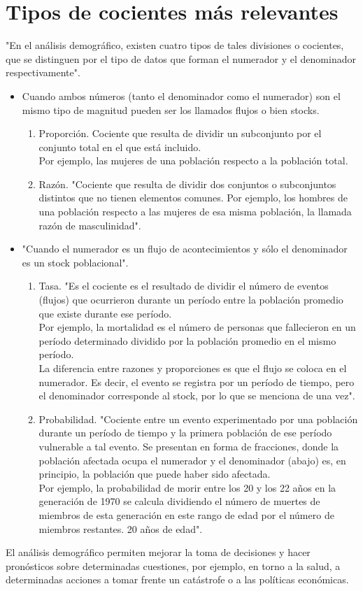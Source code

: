 \section{Tipos de cocientes más relevantes}
"En el análisis demográfico, existen cuatro tipos de tales divisiones o cocientes, que se distinguen por el tipo de datos que forman el numerador y el denominador respectivamente".
\begin{itemize}
    \item Cuando ambos números (tanto el denominador como el numerador) son el mismo tipo de magnitud pueden ser los llamados flujos o bien stocks.
    \begin{enumerate}
        \item Proporción. Cociente que resulta de dividir un subconjunto por el conjunto total en el que está incluido.\\
        Por ejemplo, las mujeres de una población respecto a la población total.
        \item Razón. "Cociente que resulta de dividir dos conjuntos o subconjuntos distintos que no tienen elementos comunes. Por ejemplo, los hombres de una población respecto a las mujeres de esa misma población, la llamada razón de masculinidad".
    \end{enumerate}
    \item "Cuando el numerador es un flujo de acontecimientos y sólo el denominador es un stock poblacional".
    \begin{enumerate}
        \item Tasa. "Es el cociente es el resultado de dividir el número de eventos (flujos) que ocurrieron durante un período entre la población promedio que existe durante ese período. \\ Por ejemplo, la mortalidad es el número de personas que fallecieron en un período determinado dividido por la población promedio en el mismo período. \\ La diferencia entre razones y proporciones es que el flujo se coloca en el numerador. Es decir, el evento se registra por un período de tiempo, pero el denominador corresponde al stock, por lo que se menciona de una vez".
        \item Probabilidad. "Cociente entre un evento experimentado por una población durante un período de tiempo y la primera población de ese período vulnerable a tal evento. Se presentan en forma de fracciones, donde la población afectada ocupa el numerador y el denominador (abajo) es, en principio, la población que puede haber sido afectada. \\ Por ejemplo, la probabilidad de morir entre los 20 y los 22 años en la generación de 1970 se calcula dividiendo el número de muertes de miembros de esta generación en este rango de edad por el número de miembros restantes. 20 años de edad".
    \end{enumerate}
\end{itemize}
El análisis demográfico permiten mejorar la toma de decisiones y hacer pronósticos sobre determinadas cuestiones, por ejemplo, en torno a la salud, a determinadas acciones a tomar frente un catástrofe o a las políticas económicas.
